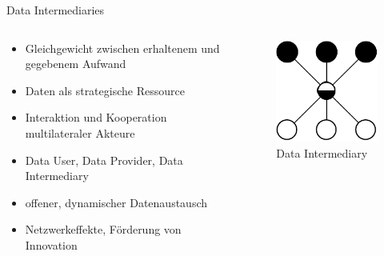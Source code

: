 \begin{frame}{Data Intermediaries \footnotesize\cite{mollerIndustrialDataEcosystems2024}}
    \begin{columns}
        \begin{column}{0.6\textwidth}
            \begin{itemize}
                \item Gleichgewicht zwischen erhaltenem und gegebenem Aufwand
                \item Daten als strategische Ressource %
                
                \item<2-> Interaktion und Kooperation \alert{multilateraler} Akteure
                \item<2-> Data User, Data Provider, Data Intermediary
                
                \item<3-> offener, dynamischer Datenaustausch
                \item<3-> Netzwerkeffekte, Förderung von Innovation
            \end{itemize}
        \end{column}
        
        \begin{column}{0.4\textwidth}
            \begin{figure}
                \centering
                \includegraphics[height=0.5\textheight]{./assets/industrial_de_architecture.drawio.pdf}
                \caption{Data Intermediary}
            \end{figure}
        \end{column}
    \end{columns}
\end{frame}


